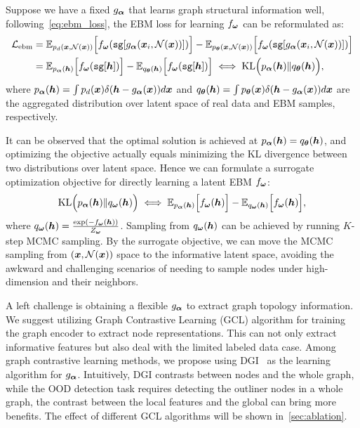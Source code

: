 Suppose we have a fixed $g_{\bm{\alpha}}$ that learns graph structural information well, following~\cref{eq:ebm_loss}, the EBM loss for learning $f_{{\bm{\omega}}}$ can be reformulated as:
\begin{equation*}
\begin{aligned}
    \mathcal{L}_{\text{ebm}}
    & = {\mathbb{E}}_{p_d({\bm{x}},\mathcal{N}({\bm{x}}))} \Big[ f_{\bm{\omega}}(\texttt{sg}[g_{\bm{\alpha}}({\bm{x}}_i,\mathcal{N}({\bm{x}}))]) \Big] - {\mathbb{E}}_{p_{\bm{\theta}}({\bm{x}},\mathcal{N}({\bm{x}}))} \Big[ f_{\bm{\omega}}(\texttt{sg}[g_{\bm{\alpha}}({\bm{x}}_i,\mathcal{N}({\bm{x}}))]) \Big] \\
    & = {\mathbb{E}}_{p_{\bm{\alpha}}({\bm{h}})}\Big[ f_{\bm{\omega}}(\texttt{sg}[{\bm{h}}]) \Big] - {\mathbb{E}}_{q_{{\bm{\theta}}}({\bm{h}})} \Big[ f_{\bm{\omega}}(\texttt{sg}[{\bm{h}}]) \Big]
    \iff \mathrm{KL} \Big( p_{\bm{\alpha}}({\bm{h}}) \| q_{\bm{\theta}}({\bm{h}}) \Big),
 \end{aligned}
\end{equation*}
where $p_{\bm{\alpha}}({\bm{h}}) = \int p_d({\bm{x}})\delta({\bm{h}} - g_{\bm{\alpha}}({\bm{x}}))d{\bm{x}}$ and $q_{\bm{\theta}}({\bm{h}}) = \int p_{\bm{\theta}}({\bm{x}})\delta({\bm{h}} - g_{\bm{\alpha}}({\bm{x}}))d{\bm{x}}$ are the aggregated distribution over latent space of real data and EBM samples, respectively.


It can be observed that the optimal solution is achieved at $p_{\bm{\alpha}}({\bm{h}})=q_{\bm{\theta}}({\bm{h}})$, and optimizing the objective actually equals minimizing the KL divergence between two distributions over latent space. Hence we can formulate a surrogate optimization objective for directly learning a latent EBM $f_{{\bm{\omega}}}$:
\begin{equation}
\label{eq:lebm_obj}
    \mathrm{KL} \Big( p_{\bm{\alpha}}({\bm{h}}) \| q_{\bm{\omega}}({\bm{h}}) \Big) 
    \iff {\mathbb{E}}_{p_{\bm{\alpha}}({\bm{h}})} \Big[ f_{{\bm{\omega}}}({\bm{h}}) \Big] - {\mathbb{E}}_{q_{\bm{\omega}}({\bm{h}})} \Big[ f_{{\bm{\omega}}}({\bm{h}}) \Big],
\end{equation}
where $q_{\bm{\omega}}({\bm{h}}) = \frac{\exp(-f_{\bm{\omega}}({\bm{h}}))}{Z_{\bm{\omega}}}$. Sampling from $q_{\bm{\omega}}({\bm{h}})$ can be achieved by running $K$-step MCMC sampling. 
By the surrogate objective, we can move the MCMC sampling from $({\bm{x}},\mathcal{N}({\bm{x}}))$ space to the informative latent space, avoiding the awkward and challenging scenarios of needing to sample nodes under high-dimension and their neighbors.

A left challenge is obtaining a flexible $g_{\bm{\alpha}}$ to extract graph topology information. 
We suggest utilizing Graph Contrastive Learning (GCL) algorithm for training the graph encoder to extract node representations. 
This can not only extract informative features but also deal with the limited labeled data case. Among graph contrastive learning methods, we propose using DGI~\citep{dgi} as the learning algorithm for $g_{\bm{\alpha}}$. 
Intuitively, DGI contrasts between nodes and the whole graph, while the OOD detection task requires detecting the outliner nodes in a whole graph, the contrast between the local features and the global can bring more benefits. 
The effect of different GCL algorithms will be shown in~\cref{sec:ablation}.  


